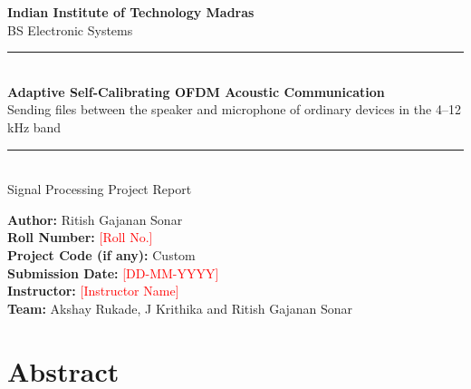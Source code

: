 \documentclass[11pt,a4paper]{report}
\newcommand{\fillin}[1]{\textcolor{red}{[#1]}}
\begin{document}
\begin{titlepage}
    \centering
    \vspace*{1cm}

    {\Large \textbf{Indian Institute of Technology Madras}}\\[0.3cm]
    {\large BS Electronic Systems}\\[2cm]

    \rule{\linewidth}{0.5mm}\\[0.5cm]
    {\Huge \textbf{Adaptive Self-Calibrating OFDM Acoustic Communication}}\\[0.4cm]
    {\Large Sending files between the speaker and microphone of ordinary devices in the 4--12\,kHz band}\\
    \rule{\linewidth}{0.5mm}\\[2cm]

    {\large Signal Processing Project Report}\\[2cm]

    \begin{flushleft}
    \textbf{Author:} Ritish Gajanan Sonar\\[0.3cm]
    \textbf{Roll Number:} \fillin{Roll No.}\\[0.3cm]
    \textbf{Project Code (if any):} Custom\\[0.3cm]
    \textbf{Submission Date:} \fillin{DD-MM-YYYY}\\[0.3cm]
    \textbf{Instructor:} \fillin{Instructor Name}\\[0.3cm]
    \textbf{Team:} Akshay Rukade, J Krithika and Ritish Gajanan Sonar
    \end{flushleft}

    \vfill
\end{titlepage}

\tableofcontents
\newpage

\chapter*{Abstract}
\end{document}
